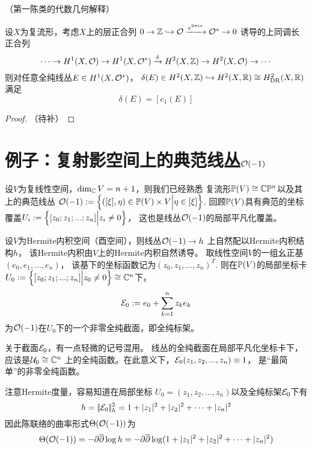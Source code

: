 \begin{thm}（第一陈类的代数几何解释）

设$X$为复流形，考虑$X$上的层正合列
$0\to\mathbb{Z}\hookrightarrow\mathcal{O}\xrightarrow{e^{2\pi i*}}\mathcal{O}^*\to 0$
诱导的上同调长正合列
$$
  \cdots\to
  H^1(X,\mathcal{O})\to H^1(X,\mathcal{O}^*)
  \xrightarrow{\delta}H^2(X,\mathbb{Z})\to H^2(X,\mathcal{O})\to\cdots
$$
则对任意全纯线丛$E\in H^1(X,\mathcal{O}^*)$，
$\delta(E)\in H^2(X,\mathbb{Z})\hookrightarrow H^2(X,\mathbb{R})\cong H^2_{\operatorname{DR}}(X,\mathbb{R})$满足
$$\delta(E)=[c_1(E)]$$
\end{thm}

\begin{proof}
{\color{red}（待补）}
\end{proof}


\section{例子：复射影空间上的典范线丛$\mathcal{O}(-1)$}

设$V$为复线性空间，$\dim_{\mathbb{C}}V=n+1$，则我们已经熟悉
复流形$\mathbb{P}(V)\cong\mathbb{C}\mathbb{P}^n$以及其上的典范线丛
$\mathcal{O}(-1):=\Big\{ ([\xi],\eta)\in\mathbb{P}(V)\times V \Big| \eta\in[\xi] \Big\}$.
回顾$\mathbb{P}(V)$具有典范的坐标覆盖$U_i:=\Big\{ [z_0;z_1;...;z_n] \Big| z_i\neq 0 \Big\}$，
这也是线丛$\mathcal{O}(-1)$的局部平凡化覆盖。

\begin{Example}
设$V$为Hermite内积空间（酉空间），则线丛$\mathcal{O}(-1)\to h$
上自然配以Hermite内积结构$h$，
该Hermite内积由$V$上的Hermite内积自然诱导。
取线性空间$V$的一组幺正基$(e_0,e_1,...,e_n)$，
该基下的坐标函数记为$(z_0,z_1,...,z_n)^T$.
则在$\mathbb{P}(V)$的局部坐标卡
$U_0:=\Big\{ [z_0;z_1;...;z_n] \Big| z_0\neq 0 \Big\}\cong\mathbb{C}^n$下，
$$\mathcal{E}_0:=e_0+\sum_{k=1}^{n}z_ke_k$$
为$\mathcal{O}(-1)$在$U_0$下的一个非零全纯截面，即全纯标架。
\end{Example}

关于截面$\mathcal{E}_0$，有一点轻微的记号混用。
线丛的全纯截面在局部平凡化坐标卡下，应该是$\mathcal{U}_0\cong\mathbb{C}^n$
上的全纯函数。在此意义下，$\mathcal{E}_0(z_1,z_2,...,z_n)\equiv 1$，
是“最简单”的非零全纯函数。

注意Hermite度量，容易知道在局部坐标
$U_0=(z_1,z_2,...,z_n)$以及全纯标架$\mathcal{E}_0$下有
$$
  h=|\!|\mathcal{E}_0|\!|^2_h=1+|z_1|^2+|z_2|^2+\cdots+|z_n|^2
$$
因此陈联络的曲率形式$\Theta(\mathcal{O}(-1))$为
$$
  \Theta(\mathcal{O}(-1))=-\partial\overline{\partial}\log h
=
  -\partial\overline{\partial}\log(1+|z_1|^2+|z_2|^2+\cdots+|z_n|^2)
$$

